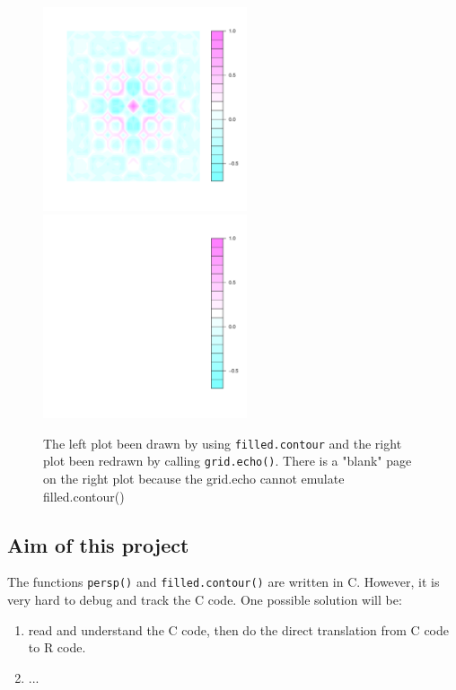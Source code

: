 \documentclass[a4paper,10pt]{article}\usepackage[]{graphicx}\usepackage[]{color}
\begin{document}
\begin{figure}[h]
\begin{center}
  \includegraphics[height = 6cm, width = 6cm]{figure/filled-contour.pdf}
  \includegraphics[height = 6cm, width = 6cm]{figure/filled-contour-gridecho.pdf}
  \caption{The left plot been drawn by using \texttt{filled.contour} and the right plot been redrawn by calling \texttt{grid.echo()}. There is a "blank" page on the right plot because the grid.echo cannot emulate filled.contour()}
  	\label{figure4}
\end{center}
\end{figure}

\subsection{Aim of this project}
The functions \texttt{persp()} and \texttt{filled.contour()} are written in C. However, it is very hard to debug and track the C code. One possible solution will be:  \\

\begin{enumerate}
  \item  read and understand the C code, then do the direct translation from C code to R code. \\
  \item ...
\end{enumerate}
\end{document}
